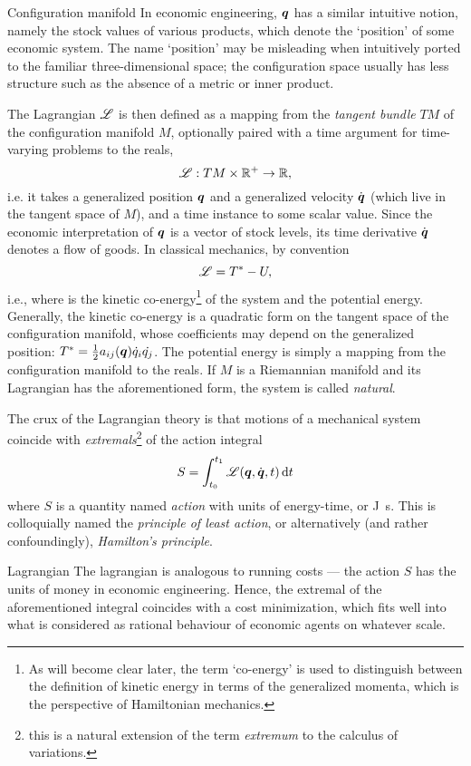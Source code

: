 \begin{econ}{Configuration manifold}
    In economic engineering, \(\vb*{q}\) has a similar intuitive notion, namely the stock values of various products, which denote the `position' of some economic system. The name `position' may be misleading when intuitively ported to the familiar three-dimensional space; the configuration space usually has less structure such as the absence of a metric or inner product.
\end{econ}

The Lagrangian \(\mathscr{L}\) is then defined as a mapping from the \emph{tangent bundle} \(TM\) of the configuration manifold \(M\), optionally paired with a time argument for time-varying problems to the reals,
    \[ \mathscr{L} : TM \times \mathbb{R}^+ \to \mathbb{R}, \]
    i.e. it takes a generalized position \(\vb*{q}\) and a generalized velocity \(\dot{\vb*{q}}\) (which live in the tangent space of \(M\)), and a time instance to some scalar value. Since the economic interpretation of \(\vb*{q}\) is a vector of stock levels, its time derivative \(\dot{\vb*{q}}\) denotes a flow of goods. In classical mechanics, by convention 
    \[\mathscr{L} = T^* - U,\] 
    i.e., where \ecokin is the kinetic co-energy\footnote{As will become clear later, the term `co-energy' is used to distinguish between the definition of kinetic energy in terms of the generalized momenta, which is the perspective of Hamiltonian mechanics.} of the system and \epot the potential energy. Generally, the kinetic co-energy is a quadratic form on the tangent space of the configuration manifold, whose coefficients may depend on the generalized position: \(T^* = \frac{1}{2}a_{ij}(\vb*{q})\dot{q}_i\dot{q_j} \). The potential energy is simply a mapping from the configuration manifold to the reals. If \(M\) is a Riemannian manifold and its Lagrangian has the aforementioned form, the system is called \emph{natural}.

The crux of the Lagrangian theory is that motions of a mechanical system coincide with \emph{extremals}\footnote{this is a natural extension of the term \emph{extremum} to the calculus of variations.} of the action integral
\[ S = \int^{t_1}_{t_0} \mathscr{L}(\vb*{q}, \dot{\vb*{q}}, t) \dd{t}\]
where \(S\) is a quantity named \emph{action} with units of energy-time, or \si{\joule \second}. This is colloquially named the \emph{principle of least action}, or alternatively (and rather confoundingly), \emph{Hamilton's principle}.

\begin{econ}{Lagrangian}
   The lagrangian is analogous to running costs --- the action \(S\) has the units of money in economic engineering. Hence, the extremal of the aforementioned integral coincides with a cost minimization, which fits well into what is considered as rational behaviour of economic agents on whatever scale. 
\end{econ}


